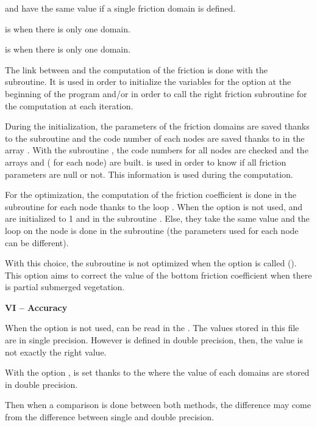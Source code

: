  and 
have the same value if a single friction domain is defined.

 is  when there is only one domain.

 is  when there is only one domain.



The link between  and the computation of the friction is done
with the  subroutine.
It is used in order to initialize the variables for the option
 at the beginning of the program and/or in order to call
the right friction subroutine for the computation at each iteration.

\textbf{}

During the initialization, the parameters of the friction domains are saved
thanks to the  subroutine and the code number of each nodes
are saved thanks to  in the array .
With the subroutine , the code numbers for all nodes are
checked and the arrays  and 
( for each node) are built.
 is used in order to know if all friction parameters are null or
not.
This information is used during the computation.

\textbf{}

For the optimization, the computation of the friction coefficient is done
in the  subroutine for each node thanks to the loop
.
When the option  is not used,  and
 are initialized to 1 and  in the subroutine
.
Else, they take the same value and the loop on the node is done in the
 subroutine (the parameters used for each node can be
different).

With this choice, the subroutine  is not optimized
when the option  is called
().
This option aims to correct the value of the bottom friction coefficient
when there is partial submerged vegetation.

\textbf{VI -- Accuracy}

When the option  is not used,  can be read
in the .
The values stored in this file are in single precision.
However  is defined in double precision, then,
the  value is not exactly the right value.

With the option ,  is set
thanks to the  where the value of each domains
are stored in double precision.

Then when a comparison is done between both methods, the difference may come
from the difference between single and double precision.
